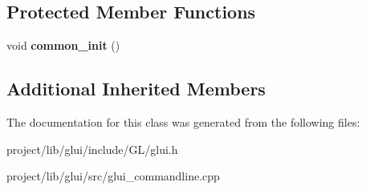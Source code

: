 \subsection*{Protected Member Functions}
\begin{DoxyCompactItemize}
\item 
\hypertarget{classGLUI__CommandLine_a21eeafb7d6f3df4d3ddee365422894b6}{void {\bfseries common\-\_\-init} ()}\label{classGLUI__CommandLine_a21eeafb7d6f3df4d3ddee365422894b6}

\end{DoxyCompactItemize}
\subsection*{Additional Inherited Members}


The documentation for this class was generated from the following files\-:\begin{DoxyCompactItemize}
\item 
project/lib/glui/include/\-G\-L/glui.\-h\item 
project/lib/glui/src/glui\-\_\-commandline.\-cpp\end{DoxyCompactItemize}
